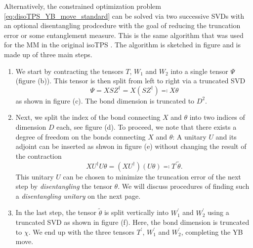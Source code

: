 Alternatively, the constrained optimization problem \eqref{eq:disoTPS_YB_move_standard} can be solved via two successive SVDs with an optional disentangling prodcedure with the goal of reducing the truncation error or some entanglement measure. This is the same algorithm that was used for the MM in the original isoTPS \cite{cite:efficient_simulation_of_dynamics_in_two_dimensional_quantum_spin_systems}. The algorithm is sketched in figure \figref{} and is made up of three main steps.
\begin{enumerate}
	\item We start by contracting the tensors $T$, $W_1$ and $W_2$ into a single tensor $\Psi$ (figure \figref{} (b)). This tensor is then split from left to right via a truncated SVD
	\begin{equation}
		\Psi = XSZ^\dagger = X\left(SZ^\dagger\right) \eqqcolon X\theta
	\end{equation}
	as shown in figure \figref{}(c). The bond dimension is truncated to $D^2$.
	\item Next, we split the index of the bond connecting $X$ and $\theta$ into two indices of dimension $D$ each, see figure \figref{}(d). To proceed, we note that there exists a degree of freedom on the bonds connecting $X$ and $\theta$: A unitary $U$ and its adjoint can be inserted as shwon in figure \figref{}(e) without changing the result of the contraction
	\begin{equation}
		XU^\dagger U\theta = \left(XU^\dagger\right)\left(U\theta\right) \eqqcolon T^\prime \tilde{\theta}.
	\end{equation}
	This unitary $U$ can be chosen to minimize the truncation error of the next step by \textit{disentangling} the tensor $\theta$. We will discuss procedures of finding such a \textit{disentangling unitary} on the next page.
	\item In the last step, the tensor $\tilde{\theta}$ is split vertically into $W_1^\prime$ and $W_2^\prime$ using a truncated SVD as shown in figure \figref{}(f). Here, the bond dimension is truncated to $\chi$. We end up with the three tensors $T^\prime$, $W_1^\prime$ and $W_2^\prime$, completing the YB move.
\end{enumerate}
